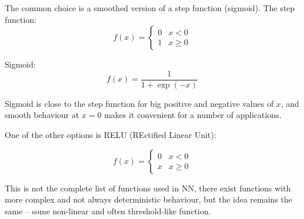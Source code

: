 The common choice is a smoothed version of a step function
(sigmoid). The step function:
$$
f(x) = \left\{ 
\begin{array}{ll}
0 & x < 0 \\
1 & x \geq 0
\end{array}
\right.
$$

\begin{center}
\end{center}

Sigmoid:
$$
f(x) = \frac{1}{1+\exp(-x)}
$$
\begin{center}
\end{center}
Sigmoid is close to the step function for big positive and negative values 
of $x$, and smooth behaviour at $x=0$ makes it convenient for a number
of applications.

One of the other options is RELU (REctified Linear Unit):

$$
f(x) = \left\{ 
\begin{array}{ll}
0 & x < 0 \\
x & x \geq 0
\end{array}
\right.
$$
\begin{center}
\end{center}

This is not the complete list of functions used in NN,
there exist functions with more complex and not always deterministic
behaviour, but the idea remains the same -- some non-linear and
often threshold-like function.

